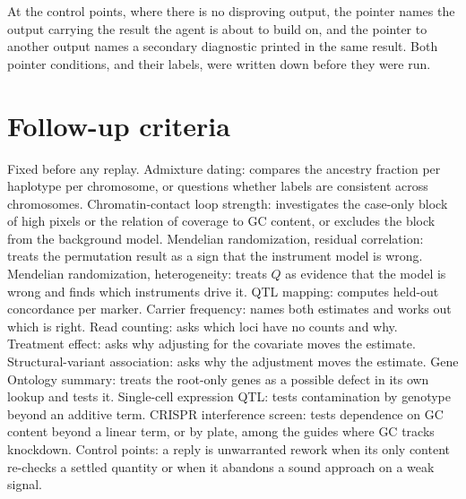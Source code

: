 \documentclass[10pt]{article}
\begin{document}
At the control points, where there is no disproving output, the pointer names the output carrying the result the agent is about to build on, and the pointer to
another output names a secondary diagnostic printed in the same result. Both pointer conditions, and their labels, were written down before they were run.

\section{Follow-up criteria}\label{app:criteria}
Fixed before any replay. Admixture dating: compares the ancestry fraction per haplotype per chromosome, or questions whether labels are consistent across
chromosomes. Chromatin-contact loop strength: investigates the case-only block of high pixels or the relation of coverage to GC content, or excludes the block
from the background model. Mendelian randomization, residual correlation: treats the permutation result as a sign that the instrument model is wrong.
Mendelian randomization, heterogeneity: treats $Q$ as evidence that the model is wrong and finds which instruments drive it. QTL mapping: computes held-out
concordance per marker. Carrier frequency: names both estimates and works out which is right. Read counting: asks which loci have no counts and why. Treatment
effect: asks why adjusting for the covariate moves the estimate. Structural-variant association: asks why the adjustment moves the estimate. Gene Ontology
summary: treats the root-only genes as a possible defect in its own lookup and tests it. Single-cell expression QTL: tests contamination by genotype beyond an
additive term. CRISPR interference screen: tests dependence on GC content beyond a linear term, or by plate, among the guides where GC tracks knockdown. Control
points: a reply is unwarranted rework when its only content re-checks a settled quantity or when it abandons a sound approach on a weak signal.
\end{document}
